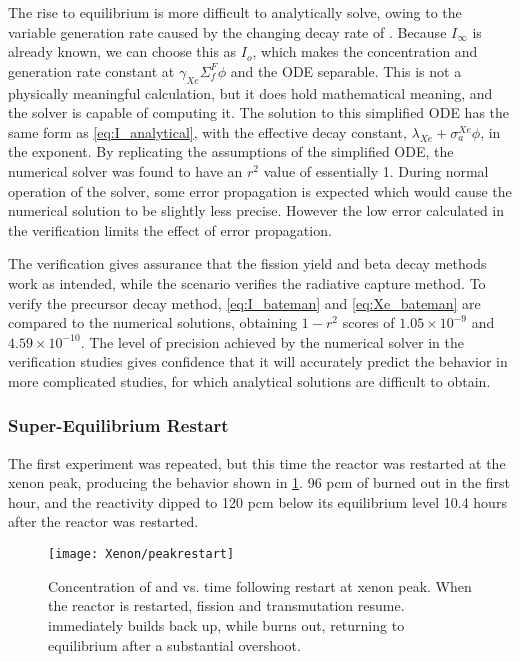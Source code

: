 The \Xe rise to equilibrium is more difficult to analytically solve, owing to the variable generation rate caused by the changing decay rate of \I. Because $I_\infty$ is already known, we can choose this as $I_o$, which makes the \I concentration and \Xe generation rate constant at $\gamma_{Xe}\Sigma_{f}^{F}{\phi}$ and the ODE separable. This is not a physically meaningful calculation, but it does hold mathematical meaning, and the solver is capable of computing it. The solution to this simplified ODE has the same form as \ref{eq:I_analytical}, with the effective decay constant, $\lambda_{Xe}+\sigma_a^{Xe}\phi$, in the exponent. By replicating the assumptions of the simplified ODE, the numerical solver was found to have an $r^2$ value of essentially 1. During normal operation of the solver, some error propagation is expected which would cause the numerical \Xe solution to be slightly less precise. However the low error calculated in the \I verification limits the effect of error propagation.

The \I verification gives assurance that the fission yield and beta decay methods work as intended, while the \Xe scenario verifies the radiative capture method. To verify the precursor decay method, \ref{eq:I_bateman} and \ref{eq:Xe_bateman} are compared to the numerical solutions, obtaining $1-r^2$ scores of $1.05\times10^{-9}$ and $4.59\times10^{-10}$. The level of precision achieved by the numerical solver in the verification studies gives confidence that it will accurately predict the behavior in more complicated studies, for which analytical solutions are difficult to obtain.

\subsubsection{Super-Equilibrium Restart}
The first experiment was repeated, but this time the reactor was restarted at the xenon peak, producing the behavior shown in \cref{fig:PeakRestart}. 96 pcm of \Xe burned out in the first hour, and the \Xe reactivity dipped to 120 pcm below its equilibrium level 10.4 hours after the reactor was restarted. 

\begin{figure}[ht!]
    \centering
    \texttt{[image: Xenon/peakrestart]}
    \caption[Concentration of \I and \Xe vs. time following restart at xenon peak]{Concentration of \I and \Xe vs. time following restart at xenon peak. When the reactor is restarted, fission and transmutation resume. \I immediately builds back up, while \Xe burns out, returning to equilibrium after a substantial overshoot.}
    \label{fig:PeakRestart}
\end{figure}

